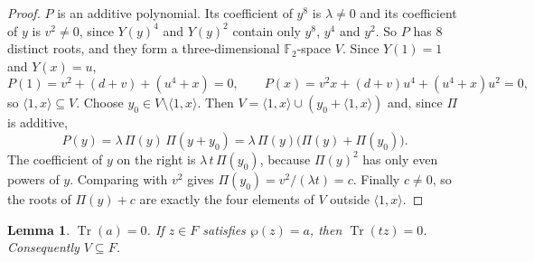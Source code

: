 \documentclass[11pt,a4paper,reqno]{amsart}
\newtheorem{lemma}[theorem]{Lemma}
\theoremstyle{remark}
\numberwithin{equation}{section}
\newcommand{\F}{\mathbb{F}}
\newcommand{\Tr}{\operatorname{Tr}}
\begin{document}
\begin{proof}
$P$ is an additive polynomial. Its coefficient of $y^8$ is $\lambda\ne0$ and its coefficient of $y$ is $v^2\ne0$, since $Y(y)^4$ and $Y(y)^2$ contain only $y^8$, $y^4$ and $y^2$. So $P$ has $8$ distinct roots, and they form a three-dimensional $\F_2$-space $V$. Since $Y(1)=1$ and $Y(x)=u$,
\[
P(1)=v^2+(d+v)+(u^4+x)=0,\qquad P(x)=v^2x+(d+v)u^4+(u^4+x)u^2=0 ,
\]
so $\langle1,x\rangle\subseteq V$. Choose $y_0\in V\setminus\langle1,x\rangle$. Then $V=\langle1,x\rangle\cup(y_0+\langle1,x\rangle)$ and, since $\Pi$ is additive,
\[
P(y)=\lambda\,\Pi(y)\,\Pi(y+y_0)=\lambda\,\Pi(y)\bigl(\Pi(y)+\Pi(y_0)\bigr).
\]
The coefficient of $y$ on the right is $\lambda\,t\,\Pi(y_0)$, because $\Pi(y)^2$ has only even powers of $y$. Comparing with $v^2$ gives $\Pi(y_0)=v^2/(\lambda t)=c$. Finally $c\ne0$, so the roots of $\Pi(y)+c$ are exactly the four elements of $V$ outside $\langle1,x\rangle$.
\end{proof}

\begin{lemma}\label{lem:inF}
$\Tr(a)=0$. If $z\in F$ satisfies $\wp(z)=a$, then $\Tr(tz)=0$. Consequently $V\subseteq F$.
\end{lemma}
\end{document}
